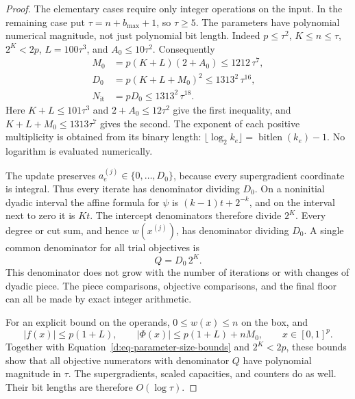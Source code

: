 \begin{proof}
The elementary cases require only integer operations on the input.
In the remaining case put \(\tau=n+b_{\max}+1\), so \(\tau\ge5\).
The parameters have polynomial numerical magnitude, not just polynomial
bit length.  Indeed \(p\le\tau^2\), \(K\le n\le\tau\),
\(2^K<2p\), \(L=100\tau^3\), and \(A_0\le10\tau^2\).
Consequently
\begin{equation}
\label{d:eq-parameter-size-bounds}
\begin{aligned}
 M_0
   &=p(K+L)(2+A_0)
        \le1212\,\tau^7,\\
 D_0
   &=p(K+L+M_0)^2
        \le1313^2\,\tau^{16},\\
 N_{\mathrm{it}}
   &=pD_0
        \le1313^2\,\tau^{18}.
\end{aligned}
\end{equation}
Here \(K+L\le101\tau^3\) and \(2+A_0\le12\tau^2\) give the first
inequality, and \(K+L+M_0\le1313\tau^7\) gives the second.
The exponent of each positive multiplicity is obtained from its binary
length: \(\lfloor\log_2 k_e\rfloor=\operatorname{bitlen}(k_e)-1\).
No logarithm is evaluated numerically.

The update preserves
\(a_e^{(j)}\in\{0,\ldots,D_0\}\), because every supergradient coordinate is
integral.  Thus every iterate has denominator dividing \(D_0\).
On a noninitial dyadic interval the affine formula for \(\psi\) is
\((k-1)t+2^{-k}\), and on the interval next to zero it is \(Kt\).
The intercept denominators therefore divide \(2^K\).
Every degree or cut sum, and hence \(w(x^{(j)})\), has denominator
dividing \(D_0\).  A single common denominator for all trial objectives is
\begin{equation}
\label{d:eq-fixed-objective-denominator}
                             Q=D_0\,2^K.
\end{equation}
This denominator does not grow with the number of iterations or with
changes of dyadic piece.  The piece comparisons, objective comparisons,
and the final floor can all be made by exact integer arithmetic.

For an explicit bound on the operands, \(0\le w(x)\le n\) on the box,
and
\[
        |f(x)|\le p(1+L),\qquad
        |\Phi(x)|\le p(1+L)+nM_0,
        \qquad x\in[0,1]^p.
\]
Together with Equation~\eqref{d:eq-parameter-size-bounds} and
\(2^K<2p\), these bounds show that all objective numerators with
denominator \(Q\) have polynomial magnitude in \(\tau\).
The supergradients, scaled capacities, and counters do as well.
Their bit lengths are therefore \(O(\log\tau)\).


\end{proof}
